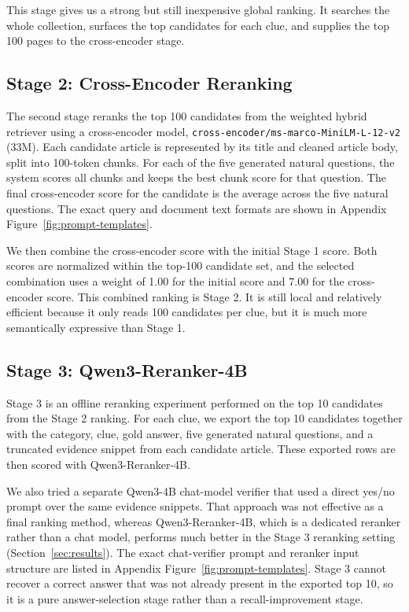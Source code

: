 \documentclass[11pt]{article}
\begin{document}
This stage gives us a strong but still inexpensive global ranking. It searches the whole collection, surfaces the top candidates for each clue, and supplies the top 100 pages to the cross-encoder stage.

\subsection{Stage 2: Cross-Encoder Reranking}

The second stage reranks the top 100 candidates from the weighted hybrid retriever using a cross-encoder model, \texttt{cross-encoder/ms-marco-MiniLM-L-12-v2} (33M). Each candidate article is represented by its title and cleaned article body, split into 100-token chunks. For each of the five generated natural questions, the system scores all chunks and keeps the best chunk score for that question. The final cross-encoder score for the candidate is the average across the five natural questions. The exact query and document text formats are shown in Appendix Figure~\ref{fig:prompt-templates}.

We then combine the cross-encoder score with the initial Stage 1 score. Both scores are normalized within the top-100 candidate set, and the selected combination uses a weight of 1.00 for the initial score and 7.00 for the cross-encoder score. This combined ranking is Stage 2. It is still local and relatively efficient because it only reads 100 candidates per clue, but it is much more semantically expressive than Stage 1.

\subsection{Stage 3: Qwen3-Reranker-4B}

Stage 3 is an offline reranking experiment performed on the top 10 candidates from the Stage 2 ranking. For each clue, we export the top 10 candidates together with the category, clue, gold answer, five generated natural questions, and a truncated evidence snippet from each candidate article. These exported rows are then scored with Qwen3-Reranker-4B.

We also tried a separate Qwen3-4B chat-model verifier that used a direct yes/no prompt over the same evidence snippets. That approach was not effective as a final ranking method, whereas Qwen3-Reranker-4B, which is a dedicated reranker rather than a chat model, performs much better in the Stage 3 reranking setting (Section~\ref{sec:results}). The exact chat-verifier prompt and reranker input structure are listed in Appendix Figure~\ref{fig:prompt-templates}. Stage 3 cannot recover a correct answer that was not already present in the exported top 10, so it is a pure answer-selection stage rather than a recall-improvement stage.
\end{document}
